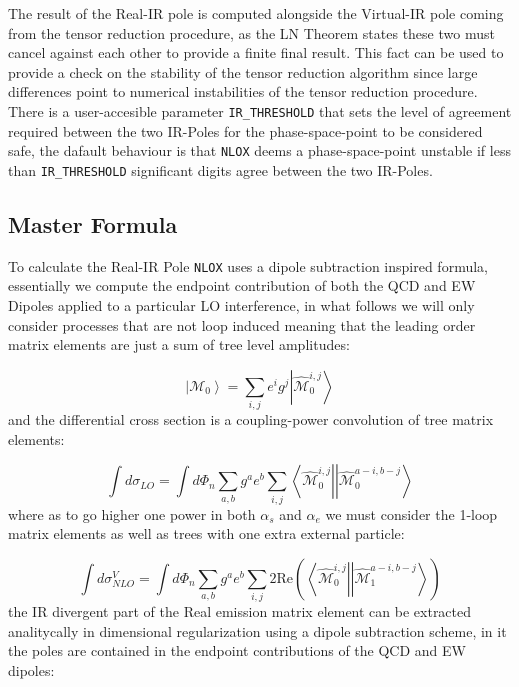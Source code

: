 \documentclass[a4paper]{article}
\def \NLOX{\texttt{NLOX} }
\def \MBra#1#2#3{\left<\hat{\mathcal{M}}_{#1}^{#2,#3}\right|}
\def \MKet#1#2#3{\left|\hat{\mathcal{M}}_{#1}^{#2,#3}\right>}
\begin{document}
The result of the Real-IR pole is computed alongside the Virtual-IR pole coming from the tensor reduction
procedure, as the LN Theorem states these two must cancel against each other to provide a finite 
final result. This fact can be used to provide a check on the stability of the tensor reduction 
algorithm since large differences point to numerical instabilities of the tensor reduction 
procedure. There is a user-accesible parameter \texttt{IR\_THRESHOLD} that sets the level 
of agreement required between the two IR-Poles for the phase-space-point to be considered safe,
the dafault behaviour is that \NLOX deems a phase-space-point unstable if less than \texttt{IR\_THRESHOLD} significant digits agree between the two IR-Poles. \\

\subsection{Master Formula}
To calculate the Real-IR Pole \NLOX uses a dipole subtraction inspired formula, essentially we 
compute the endpoint contribution of both the QCD and EW Dipoles applied to a particular LO 
interference, in what follows we will only consider processes that are not loop induced meaning 
that the leading order matrix elements are just a sum of tree level amplitudes:

\begin{equation}
 \left|\mathcal{M}_{0}\right> = \sum_{i,j}e^i g^j \left|\hat{\mathcal{M}}^{i,j}_{0}\right>
\end{equation}
and the differential cross section is a coupling-power convolution of tree matrix elements:

\begin{equation}
 \int d\sigma_{LO} = \int d\Phi_{n}
 \sum_{a,b} g^{a} e^{b}\sum_{i,j}
 \left<{\hat{\mathcal{M}}}^{i,j}_{0}\right|
 \left|{\hat{\mathcal{M}}}^{a-i,b-j}_{0}\right>
\end{equation}
where as to go higher one power in both $\alpha_s$ and $\alpha_e$ we must consider the 1-loop
matrix elements as well as trees with one extra external particle:

\begin{equation}
 \int d\sigma^V_{NLO} = 
 \int d\Phi_{n}\sum_{a,b}
 g^a e^b 
 \sum_{i,j}
 2\text{Re}\left(
 \MBra{0}{i}{j}
  \MKet{1}{a-i}{b-j}
 \right)
\end{equation}
the IR divergent part of the Real emission matrix element can be extracted analitycally in 
dimensional regularization using a dipole subtraction scheme, in it the poles are contained 
in the endpoint contributions of the QCD and EW dipoles:
\end{document}
